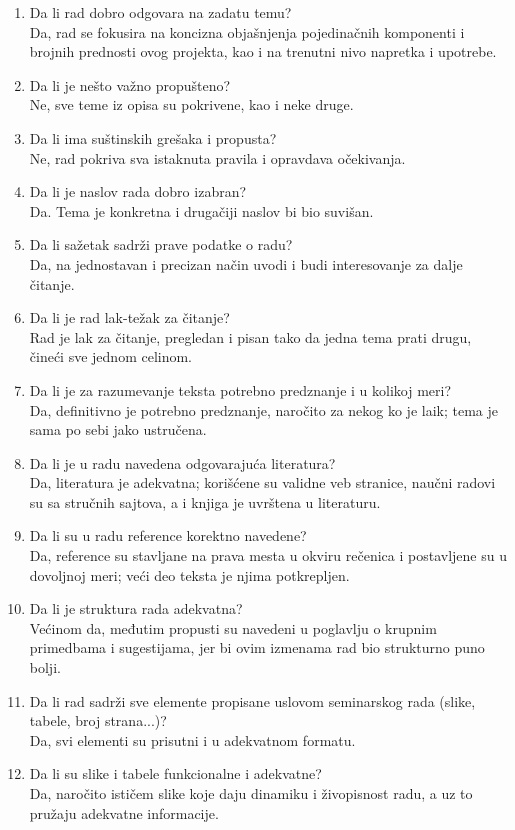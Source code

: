 \documentclass[a4paper]{report}
\begin{document}
	\begin{enumerate}
		\item Da li rad dobro odgovara na zadatu temu?\\
		Da, rad se fokusira na koncizna objašnjenja pojedinačnih komponenti i brojnih prednosti ovog projekta, kao i na trenutni nivo napretka i upotrebe.
		\item Da li je nešto važno propušteno?\\
		Ne, sve teme iz opisa su pokrivene, kao i neke druge.
		\item Da li ima suštinskih grešaka i propusta?\\
		Ne, rad pokriva sva istaknuta pravila i opravdava očekivanja.
		\item Da li je naslov rada dobro izabran?\\
		Da. Tema je konkretna i drugačiji naslov bi bio suvišan.
		\item Da li sažetak sadrži prave podatke o radu?\\
		Da, na jednostavan i precizan način uvodi i budi interesovanje za dalje čitanje.
		\item Da li je rad lak-težak za čitanje?\\
		Rad je lak za čitanje, pregledan i pisan tako da jedna tema prati drugu, čineći sve jednom celinom. 
		\item Da li je za razumevanje teksta potrebno predznanje i u kolikoj meri?\\
		Da, definitivno je potrebno predznanje, naročito za nekog ko je laik; tema je sama po sebi jako ustručena.
		\item Da li je u radu navedena odgovarajuća literatura?\\
		Da, literatura je adekvatna; korišćene su validne veb stranice, naučni radovi su sa stručnih sajtova, a i knjiga je uvrštena u literaturu.
		\item Da li su u radu reference korektno navedene?\\
		Da, reference su stavljane na prava mesta u okviru rečenica i postavljene su u dovoljnoj meri; veći deo teksta je njima potkrepljen. 
		\item Da li je struktura rada adekvatna?\\
		Većinom da, međutim propusti su navedeni u poglavlju o krupnim primedbama i sugestijama, jer bi ovim izmenama rad bio strukturno puno bolji.
		\item Da li rad sadrži sve elemente propisane uslovom seminarskog rada (slike, tabele, broj strana...)?\\
		Da, svi elementi su prisutni i u adekvatnom formatu.
		\item Da li su slike i tabele funkcionalne i adekvatne?\\
		Da, naročito ističem slike koje daju dinamiku i živopisnost radu, a uz to pružaju adekvatne informacije.
	\end{enumerate}
	
\end{document}
